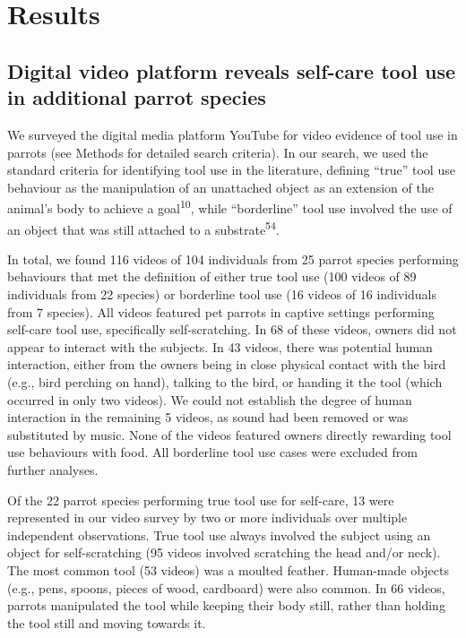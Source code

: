 \documentclass[
  man, donotrepeattitle,floatsintext]{apa6}
\begin{document}
\hypertarget{results}{%
\section{Results}\label{results}}

\hypertarget{digital-video-platform-reveals-self-care-tool-use-in-additional-parrot-species}{%
\subsection{Digital video platform reveals self-care tool use in additional parrot species}\label{digital-video-platform-reveals-self-care-tool-use-in-additional-parrot-species}}

We surveyed the digital media platform YouTube for video evidence of tool use in
parrots (see Methods for detailed search criteria). In our search, we used the
standard criteria for identifying tool use in the literature, defining ``true''
tool use behaviour as the manipulation of an unattached object as an extension
of the animal's body to achieve a goal\textsuperscript{10}, while ``borderline'' tool
use involved the use of an object that was still attached to a substrate\textsuperscript{54}.

In total, we found 116 videos of
104 individuals from
25
parrot species performing behaviours that met the definition of either true tool
use (100 videos of
89
individuals from
22
species) or borderline tool use (16 videos of
16
individuals from
7
species). All videos featured pet parrots in captive settings performing
self-care tool use, specifically self-scratching. In
68 of these
videos, owners did not appear to interact with the subjects. In
43 videos,
there was potential human interaction, either from the owners being in close physical
contact with the bird (e.g., bird perching on hand), talking to the bird, or
handing it the tool (which occurred in only two videos). We could not establish
the degree of human interaction in the remaining
5
videos, as sound had been removed or was substituted by music. None of the
videos featured owners directly rewarding tool use behaviours with food. All
borderline tool use cases were excluded from further analyses.

Of the 22
parrot species performing true tool use for self-care,
13
were represented in our video survey by two or more individuals over multiple
independent observations. True tool use always involved the subject using an
object for self-scratching (95
videos involved scratching the head and/or neck). The most common tool (53
videos) was a moulted feather. Human-made objects (e.g., pens, spoons, pieces of
wood, cardboard) were also common. In 66
videos, parrots manipulated the tool while keeping their body still, rather than
holding the tool still and moving towards it.
\end{document}
